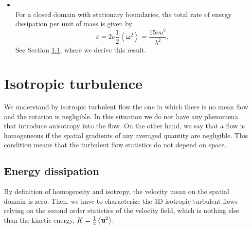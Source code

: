 \begin{itemize}
\item{}\\For a closed domain with stationary boundaries, the total rate of energy dissipation per unit of mass is given by
$$\varepsilon=2\nu\frac{1}{2}\left\langle\boldsymbol{\omega}^2\right\rangle=\frac{15\nu u^2}{\lambda^2}.$$
See Section \ref{subsec-isotropic_energy_dissipation}, where we derive this result.
\end{itemize}

\section{Isotropic turbulence}
\label{sec-C3_isotropic_turbulence}
We understand by isotropic turbulent flow the one in which there is no mean flow and the rotation is negligible. In this situation we do not have any phenomena that introduce anisotropy into the flow. On the other hand, we say that a flow is homogeneous if the spatial gradients of any averaged quantity are negligible. This condition means that the turbulent flow statistics do not depend on space.

\subsection{Energy dissipation}
\label{subsec-isotropic_energy_dissipation}
By definition of homogeneity and isotropy, the velocity mean on the spatial domain is zero. Then, we have to characterize the 3D isotropic turbulent flows relying on the second order statistics of the velocity field, which is nothing else than the kinetic energy, $K=\frac{1}{2}\left\langle{\bf u}^2\right\rangle$.

